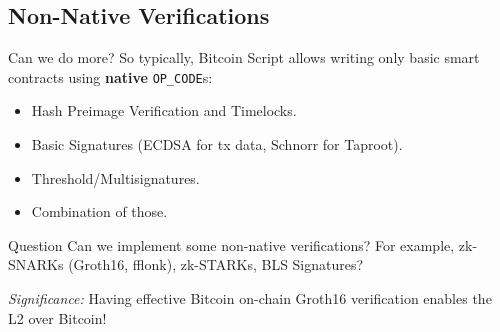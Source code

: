 \documentclass{zkdl-presentation-template}
\newcommand{\cmark}{\textcolor{green!65!black}{\ding{51}}}%
\begin{document}
    \subsection{Non-Native Verifications}
    \begin{frame}{Can we do more?}
        So typically, Bitcoin Script allows writing only basic smart contracts using \textbf{native} \texttt{OP\_CODE}s: 
        \begin{itemize}[label=\cmark]
            \item Hash Preimage Verification and Timelocks.\pause
            \item Basic Signatures (ECDSA for tx data, Schnorr for Taproot).\pause
            \item Threshold/Multisignatures.\pause
            \item Combination of those.\pause
        \end{itemize}

        \begin{alertblock}{Question}
            Can we implement some non-native verifications? For example, zk-SNARKs (Groth16, fflonk), zk-STARKs, BLS Signatures?
        \end{alertblock}

        \pause\textit{Significance:} Having effective Bitcoin on-chain Groth16
        verification enables the L2 over Bitcoin!
    \end{frame}
\end{document}
